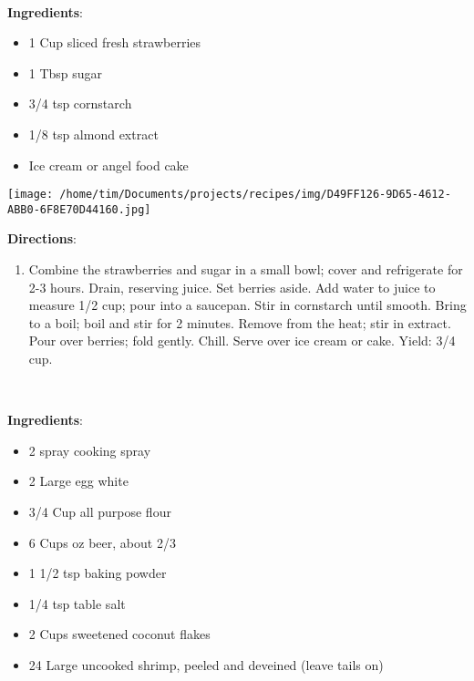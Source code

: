 \documentclass[11pt, twoside, openany]{book}
\begin{document}
 \label{fresh-strawberry-sauce-recipe}\hfill\textit{}\\
\begin{minipage}[t]{0.8\linewidth}
\textbf{Ingredients}:\vspace{-3mm}
\begin{multicols}{2}
\begin{itemize}\setlength\itemsep{-1mm}
\item 1 Cup sliced fresh strawberries
\item 1 Tbsp sugar
\item 3/4 tsp cornstarch
\item 1/8 tsp almond extract
\item Ice cream or angel food cake
\end{itemize}
\end{multicols}
\end{minipage}
\begin{minipage}[t]{0.2\linewidth}
\centering \strut\vspace*{-\baselineskip}\newline
\texttt{[image: /home/tim/Documents/projects/recipes/img/D49FF126-9D65-4612-ABB0-6F8E70D44160.jpg]}\\
\end{minipage}\vspace{3mm}
\textbf{Directions}:
\vspace{-3mm}\begin{enumerate}\setlength\itemsep{-1mm}
\item Combine the strawberries and sugar in a small bowl; cover and refrigerate for 2-3 hours. Drain, reserving juice. Set berries aside. Add water to juice to measure 1/2 cup; pour into a saucepan. Stir in cornstarch until smooth. Bring to a boil; boil and stir for 2 minutes. Remove from the heat; stir in extract. Pour over berries; fold gently. Chill. Serve over ice cream or cake. Yield: 3/4 cup.
\end{enumerate}
 \label{coconut-shrimp}\hfill\textit{}\\
\begin{minipage}[t]{0.8\linewidth}
\textbf{Ingredients}:\vspace{-3mm}
\begin{multicols}{2}
\begin{itemize}\setlength\itemsep{-1mm}
\item 2 spray cooking spray
\item 2 Large egg white
\item 3/4 Cup all purpose flour
\item 6 Cups oz beer, about 2/3
\item 1 1/2 tsp baking powder
\item 1/4 tsp table salt
\item 2 Cups sweetened coconut flakes
\item 24 Large uncooked shrimp, peeled and deveined (leave tails on)
\end{itemize}
\end{multicols}
\end{minipage}
\end{document}
